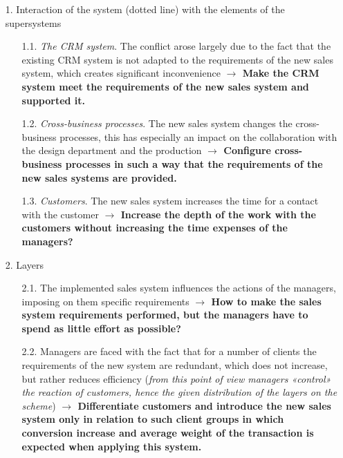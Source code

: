 \documentclass[11pt,a4paper]{book}
\begin{document}
\begin{itemize}
\item[1.] Interaction of the system (dotted line) with the elements of the
  supersystems
  \begin{itemize}
  \item[1.1.]  \emph{The CRM system}. The conflict arose largely due to the
    fact that the existing CRM system is not adapted to the requirements of
    the new sales system, which creates significant inconvenience
    \textbf{$\to$ Make the CRM system meet the requirements of the new sales
      system and supported it.}
  \item [1.2.] \emph{Cross-business processes}. The new sales system changes
    the cross-business processes, this has especially an impact on the
    collaboration with the design department and the production \textbf{$\to$
      Configure cross-business processes in such a way that the requirements
      of the new sales systems are provided.}
  \item [1.3.]  \emph{Customers}. The new sales system increases the time for
    a contact with the customer \textbf{$\to$ Increase the depth of the work
      with the customers without increasing the time expenses of the
      managers?}
  \end{itemize}
\item [2.] Layers
  \begin{itemize}
  \item [2.1.] The implemented sales system influences the actions of the
    managers, imposing on them specific requirements \textbf{$\to$ How to make
      the sales system requirements performed, but the managers have to spend
      as little effort as possible?}
  \item [2.2.] Managers are faced with the fact that for a number of clients
    the requirements of the new system are redundant, which does not increase,
    but rather reduces efficiency (\emph{from this point of view managers
      «control» the reaction of customers, hence the given distribution of the
      layers on the scheme}) \textbf{$\to$ Differentiate customers and
      introduce the new sales system only in relation to such client groups in
      which conversion increase and average weight of the transaction is
      expected when applying this system.}
  \end{itemize}
\end{itemize}

\end{document}
